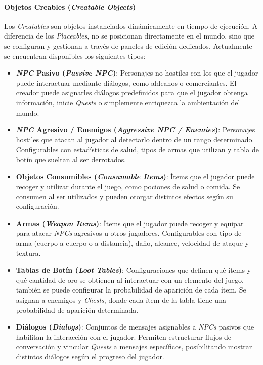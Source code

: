 \paragraph{Objetos Creables (\textit{Creatable Objects})}

Los \textit{Creatables} son objetos instanciados dinámicamente en tiempo de ejecución. A diferencia de los \textit{Placeables}, no se
posicionan directamente en el mundo, sino que se configuran y gestionan a través de paneles de edición dedicados.
Actualmente se encuentran disponibles los siguientes tipos:

\begin{itemize}
  \item \textbf{\textit{NPC} Pasivo (\textit{Passive NPC})}: Personajes no hostiles con los que el jugador puede
  interactuar mediante diálogos, como aldeanos o comerciantes. El creador puede asignarles diálogos predefinidos
  para que el jugador obtenga información, inicie \textit{Quests} o simplemente enriquezca la ambientación del mundo.

  \item \textbf{\textit{NPC} Agresivo / Enemigos (\textit{Aggressive NPC / Enemies})}: Personajes hostiles que atacan al jugador al
  detectarlo dentro de un rango determinado. Configurables con estadísticas de salud, tipos de armas que utilizan
  y tabla de botín que sueltan al ser derrotados.

  \item \textbf{Objetos Consumibles (\textit{Consumable Items})}: Ítems que el jugador puede recoger y utilizar durante
  el juego, como pociones de salud o comida. Se consumen al ser utilizados y pueden otorgar distintos efectos
  según su configuración.

  \item \textbf{Armas (\textit{Weapon Items})}: Ítems que el jugador puede recoger y equipar para atacar \textit{NPCs} agresivos
  u otros jugadores. Configurables con tipo de arma (cuerpo a cuerpo o a distancia), daño, alcance, velocidad
  de ataque y textura.

  \item \textbf{Tablas de Botín (\textit{Loot Tables})}: Configuraciones que definen qué ítems y qué cantidad de oro
  se obtienen al interactuar con un elemento del juego, también se puede configurar la probabilidad de aparición de cada ítem. 
  Se asignan a enemigos y \textit{Chests}, donde cada ítem de la tabla tiene una probabilidad de aparición determinada.

  \item \textbf{Diálogos (\textit{Dialogs})}: Conjuntos de mensajes asignables a \textit{NPCs} pasivos que habilitan la
  interacción con el jugador. Permiten estructurar flujos de conversación y vincular \textit{Quests} a mensajes
  específicos, posibilitando mostrar distintos diálogos según el progreso del jugador.


\end{itemize}
